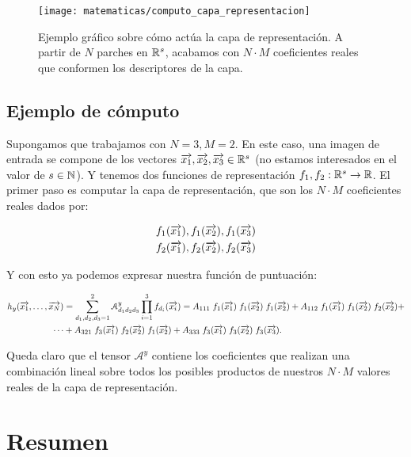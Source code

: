 \begin{figure}[!hbtp]
	\centering
	\texttt{[image: matematicas/computo\_capa\_representacion]}
	\caption{Ejemplo gráfico sobre cómo actúa la capa de representación. A partir de $N$ parches en $\mathbb{R}^s$, acabamos con $N \cdot M$ coeficientes reales que conformen los descriptores de la capa.}
\end{figure}


\subsection{Ejemplo de cómputo} \label{ejemplo:funcion_puntuacion}

Supongamos que trabajamos con $N = 3, M = 2$. En este caso, una imagen de entrada se compone de los vectores $\overrightarrow{x_1}, \overrightarrow{x_2}, \overrightarrow{x_3} \in \mathbb{R}^s$ (no estamos interesados en el valor de $s \in \mathbb{N}$). Y tenemos dos funciones de representación $f_1, f_2: \mathbb{R}^s \to \mathbb{R}$. El primer paso es computar la capa de representación, que son los $N \cdot M$ coeficientes reales dados por:

\begin{equation}
	\begin{split}
		f_1(\overrightarrow{x_1}), f_1(\overrightarrow{x_2}), f_1(\overrightarrow{x_3}) \\
		f_2(\overrightarrow{x_1}), f_2(\overrightarrow{x_2}), f_2(\overrightarrow{x_3})
	\end{split}
\end{equation}

Y con esto ya podemos expresar nuestra función de puntuación:

\begin{equation}
	\begin{split}
		h_y(\overrightarrow{x_1}, \ldots, \overrightarrow{x_N}) &= \sum_{d_1, d_2, d_3 = 1}^{2} \mathcal{A}^y_{d_1 d_2 d_3} \prod_{i = 1}^3 f_{d_i}(\overrightarrow{x_i}) = A_{111} \; f_1(\overrightarrow{x_1}) \; f_1(\overrightarrow{x_2}) \; f_1(\overrightarrow{x_2}) + A_{112} \; f_1(\overrightarrow{x_1}) \; f_1(\overrightarrow{x_2}) \; f_2(\overrightarrow{x_2}) + \\
		\cdots &+ A_{321} \; f_3(\overrightarrow{x_1}) \; f_2(\overrightarrow{x_2}) \; f_1(\overrightarrow{x_2}) + A_{333} \; f_3(\overrightarrow{x_1}) \; f_3(\overrightarrow{x_2}) \; f_3(\overrightarrow{x_3}).
	\end{split}
\end{equation}

Queda claro que el tensor $\mathcal{A}^y$ contiene los coeficientes que realizan una combinación lineal sobre todos los posibles productos de nuestros $N \cdot M$ valores reales de la capa de representación.

\section{Resumen}

